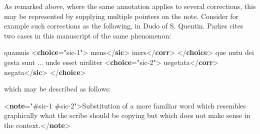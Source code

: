 As remarked above, where the same annotation applies to several corrections, this may be represented by supplying multiple pointers on the note. Consider for example such corrections as the following, in Dudo of S. Quentin. Parkes cites two cases in this manuscript of the same phenomenon: \par\bgroup{}\exampleFont \begin{shaded}\noindent\mbox{}quamuis {<\textbf{choice}\hspace*{1em}{xml:id}="{sic-1}">}\mbox{}\newline 
{}mens{</\textbf{sic}>}\mbox{}\newline 
{}iners{</\textbf{corr}>}\mbox{}\newline 
{</\textbf{choice}>} que nutu dei gesta\mbox{}\newline 
 sunt ... unde esset uiriliter \mbox{}\newline 
{<\textbf{choice}\hspace*{1em}{xml:id}="{sic-2}">}\mbox{}\newline 
{}uegetata{</\textbf{corr}>}\mbox{}\newline 
{}negata{</\textbf{sic}>}\mbox{}\newline 
{</\textbf{choice}>}\end{shaded}\egroup\par \noindent  which may be described as follows: \par\bgroup{}\exampleFont \begin{shaded}\noindent\mbox{}{<\textbf{note}\hspace*{1em}{target}="{\#sic-1 \#sic-2}">}Substitution of a more familiar word which resembles\mbox{}\newline 
 graphically what the scribe should be copying but which does not make sense in\mbox{}\newline 
 the context.{</\textbf{note}>}\end{shaded}\egroup\par \par

